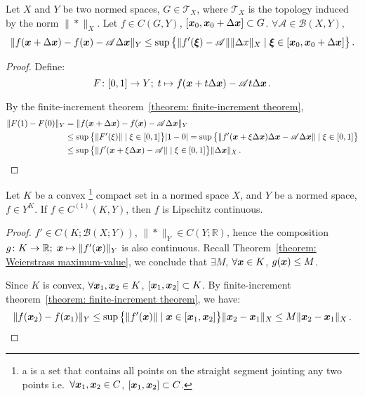 \documentclass[openany]{book}
\begin{document}
\begin{corollary}
	\label{corollary: difference between derivative and any linear operator}
	Let $X$ and $Y$ be two normed spaces, $G \in \mathscr T_X$, where $\mathscr T_X$ is the topology induced by the norm $\|*\|_X$. 
	Let $f \in C(G, Y)$, $[\boldsymbol{x}_0, \boldsymbol{x}_0 + \Delta \boldsymbol{x}] \subset G$.
	$\forall \mathscr A \in \mathcal B(X, Y)$, 
	\begin{equation*}
		\|f(\boldsymbol{x} + \Delta \boldsymbol{x}) - f(\boldsymbol{x}) - \mathscr A \Delta \boldsymbol{x}\|_Y
			\leq \sup \big\{\|f'(\boldsymbol{\xi}) - \mathscr A\| \|\Delta x\|_X 
				\mid \boldsymbol{\xi} \in [\boldsymbol{x}_0, \boldsymbol{x}_0 + \Delta \boldsymbol{x}]\big\}\,.
	\end{equation*}
\end{corollary}
\begin{proof}
	Define:
	\begin{equation*}
		F \colon [0, 1] \to Y; \; 
		t \mapsto f(\boldsymbol{x} + t \Delta \boldsymbol{x}) - \mathscr A t \Delta \boldsymbol{x}\,.
	\end{equation*}

	By the finite-increment theorem~\ref{theorem: finite-increment theorem}, 
	\begin{align*}
		\|F(1) - F(0)\|_Y 
		&= \|f(\boldsymbol{x} + \Delta \boldsymbol{x}) - f(\boldsymbol{x}) - \mathscr A \Delta \boldsymbol{x}\|_Y
		\\
		&\leq \sup\big\{\|F'(\xi)\| \mid \xi \in [0, 1]\big\} |1 - 0|
		= \sup\big\{\|f'(\boldsymbol{x} + \xi \Delta \boldsymbol{x})\Delta \boldsymbol{x} - \mathscr A \Delta \boldsymbol{x} \| \mid \xi \in [0, 1]\big\}
		\\
		&\leq \sup\big\{\|f'(\boldsymbol{x} + \xi \Delta \boldsymbol{x}) - \mathscr A \| \mid \xi \in [0, 1]\big\} \|\Delta \boldsymbol{x}\|_X\,.
	\end{align*}
\end{proof}

\begin{theorem}
	\label{theorem: continuously differentiable then Lipschitz continuous}
	Let $K$ be a convex%
		\footnote{a  is a set that contains all points on the straight segment jointing any two points i.e.\ $\forall \boldsymbol{x}_1, \boldsymbol{x}_2 \in C$, $[\boldsymbol{x}_1, \boldsymbol{x}_2] \subset C$.}
	compact set in a normed space $X$, and $Y$ be a normed space, $f \in Y^K$.
	If $f \in C^{(1)}(K, Y)$, then $f$ is Lipschitz continuous.
\end{theorem}
\begin{proof}
	$f' \in C(K; \mathcal B(X; Y))$, $\|*\|_Y \in C (Y; \mathbb R)$, hence the composition~$g \colon K \to \mathbb R;\; \boldsymbol{x} \mapsto \|f'(\boldsymbol{x})\|_Y$ is also continuous. 
	Recall Theorem~\ref{theorem: Weierstrass maximum-value}, we conclude that $\exists M$, $\forall \boldsymbol{x} \in K$, $g(\boldsymbol{x}) \leq M$.

	Since $K$ is convex, $\forall \boldsymbol{x}_1, \boldsymbol{x}_2 \in K$, $[\boldsymbol{x}_1, \boldsymbol{x}_2] \subset K$. 
	By finite-increment theorem~\ref{theorem: finite-increment theorem}, we have:
	\begin{equation*}
		\|f(\boldsymbol{x}_2) - f(\boldsymbol{x}_1)\|_Y 
			\leq \sup\big\{\|f'(\boldsymbol{x})\| \mid \boldsymbol{x} \in [\boldsymbol{x}_1, \boldsymbol{x}_2]\big\} 
				\|\boldsymbol{x}_2 - \boldsymbol{x}_1\|_X
			\leq M  \|\boldsymbol{x}_2 - \boldsymbol{x}_1\|_X \,.
	\end{equation*}
\end{proof}
\end{document}
